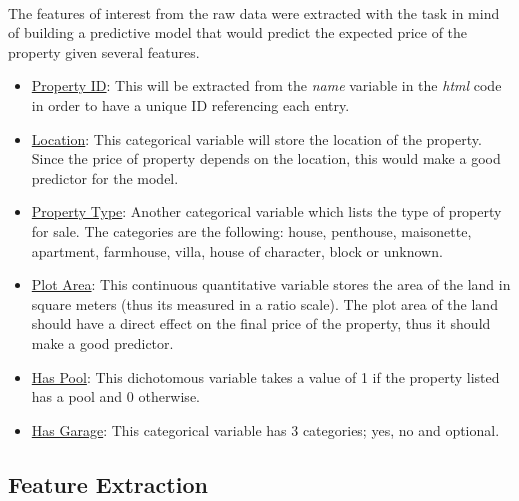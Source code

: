 \documentclass[12pt]{report}
\begin{document}
	\paragraph{ }The features of interest from the raw data were extracted with the task in mind of building a predictive model that would predict the expected price of the property given several features.
	\begin{itemize}
		\item \underline{Property ID}: This will be extracted from the \textit{name} variable in the \textit{html} code in order to have a unique ID referencing each entry.
		\item \underline{Location}: This categorical variable will store the location of the property. Since the price of property depends on the location, this would make a good predictor for the model.
		\item \underline{Property Type}: Another categorical variable which lists the type of property for sale. The categories are the following: house, penthouse, maisonette, apartment, farmhouse, villa, house of character, block or unknown.
		\item \underline{Plot Area}: This continuous quantitative variable stores the area of the land in square meters (thus its measured in a ratio scale). The plot area of the land should have a direct effect on the final price of the property, thus it should make a good predictor.
		\item \underline{Has Pool}: This dichotomous variable takes a value of 1 if the property listed has a pool and 0 otherwise.
		\item \underline{Has Garage}: This categorical variable has 3 categories; yes, no and optional.
	\end{itemize}

	\subsection{Feature Extraction}
	
	\pagebreak
\end{document}
